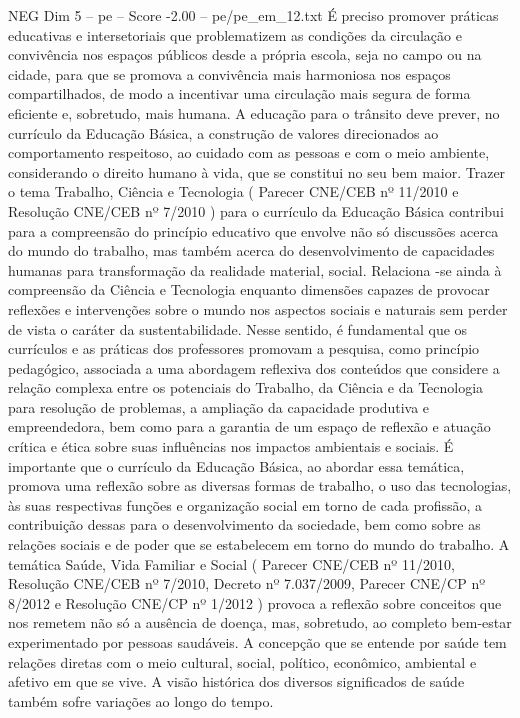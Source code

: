 \begin{textsample}{NEG Dim 5 – pe – Score -2.00 – pe/pe\_em\_12.txt}
É preciso promover práticas educativas e intersetoriais que problematizem as condições da circulação e convivência nos espaços públicos desde a própria escola, seja no campo ou na cidade, para que se promova a convivência mais harmoniosa nos espaços compartilhados, de modo a incentivar uma circulação mais segura de forma eficiente e, sobretudo, mais humana.
A educação para o trânsito deve prever, no currículo da Educação Básica, a construção de valores direcionados ao comportamento respeitoso, ao cuidado com as pessoas e com o meio ambiente, considerando o direito humano à vida, que se constitui no seu bem maior.
Trazer o tema Trabalho, Ciência e Tecnologia ( Parecer CNE/CEB nº 11/2010 e Resolução CNE/CEB nº 7/2010 ) para o currículo da Educação Básica contribui para a compreensão do princípio educativo que envolve não só discussões acerca do mundo do trabalho, mas também acerca do desenvolvimento de capacidades humanas para transformação da realidade material, social.
Relaciona -se ainda à compreensão da Ciência e Tecnologia enquanto dimensões capazes de provocar reflexões e intervenções sobre o mundo nos aspectos sociais e naturais sem perder de vista o caráter da sustentabilidade.
Nesse sentido, é fundamental que os currículos e as práticas dos professores promovam a pesquisa, como princípio pedagógico, associada a uma abordagem reflexiva dos conteúdos que considere a relação complexa entre os potenciais do Trabalho, da Ciência e da Tecnologia para resolução de problemas, a ampliação da capacidade produtiva e empreendedora, bem como para a garantia de um espaço de reflexão e atuação crítica e ética sobre suas influências nos impactos ambientais e sociais.
É importante que o currículo da Educação Básica, ao abordar essa temática, promova uma reflexão sobre as diversas formas de trabalho, o uso das tecnologias, às suas respectivas funções e organização social em torno de cada profissão, a contribuição dessas para o desenvolvimento da sociedade, bem como sobre as relações sociais e de poder que se estabelecem em torno do mundo do trabalho.
A temática Saúde, Vida Familiar e Social ( Parecer CNE/CEB nº 11/2010, Resolução CNE/CEB nº 7/2010, Decreto nº 7.037/2009, Parecer CNE/CP nº 8/2012 e Resolução CNE/CP nº 1/2012 ) provoca a reflexão sobre conceitos que nos remetem não só a ausência de doença, mas, sobretudo, ao completo bem-estar experimentado por pessoas saudáveis.
A concepção que se entende por saúde tem relações diretas com o meio cultural, social, político, econômico, ambiental e afetivo em que se vive.
A visão histórica dos diversos significados de saúde também sofre variações ao longo do tempo.

\end{textsample}
